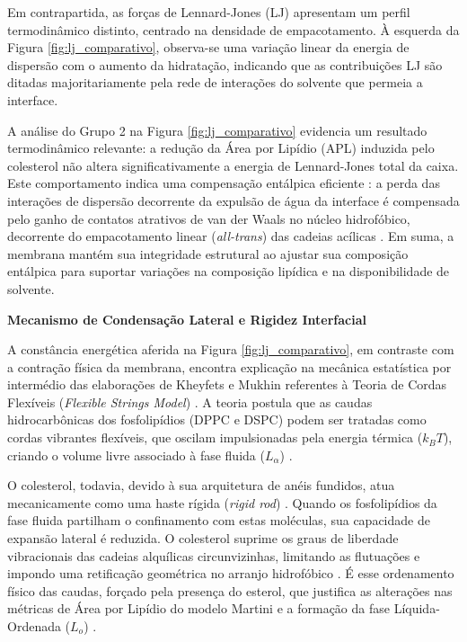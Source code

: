 Em contrapartida, as forças de Lennard-Jones (LJ) apresentam um perfil termodinâmico distinto, centrado na densidade de empacotamento. À esquerda da Figura \ref{fig:lj_comparativo}, observa-se uma variação linear da energia de dispersão com o aumento da hidratação, indicando que as contribuições LJ são ditadas majoritariamente pela rede de interações do solvente que permeia a interface.

A análise do Grupo 2 na Figura \ref{fig:lj_comparativo} evidencia um resultado termodinâmico relevante: a redução da Área por Lipídio (APL) induzida pelo colesterol não altera significativamente a energia de Lennard-Jones total da caixa. Este comportamento indica uma compensação entálpica eficiente \cite{bennett2018}: a perda das interações de dispersão decorrente da expulsão de água da interface é compensada pelo ganho de contatos atrativos de van der Waals no núcleo hidrofóbico, decorrente do empacotamento linear (\textit{all-trans}) das cadeias acílicas \cite{kheyfets2015}. Em suma, a membrana mantém sua integridade estrutural ao ajustar sua composição entálpica para suportar variações na composição lipídica e na disponibilidade de solvente.


\vspace{1em}
\noindent\textbf{Mecanismo de Condensação Lateral e Rigidez Interfacial}

A constância energética aferida na Figura \ref{fig:lj_comparativo}, em contraste com a contração física da membrana, encontra explicação na mecânica estatística por intermédio das elaborações de Kheyfets e Mukhin referentes à Teoria de Cordas Flexíveis (\textit{Flexible Strings Model}) \cite{kheyfets2015}. A teoria postula que as caudas hidrocarbônicas dos fosfolipídios (DPPC e DSPC) podem ser tratadas como cordas vibrantes flexíveis, que oscilam impulsionadas pela energia térmica ($k_B T$), criando o volume livre associado à fase fluida ($L_\alpha$) \cite{kheyfets2015}.

O colesterol, todavia, devido à sua arquitetura de anéis fundidos, atua mecanicamente como uma haste rígida (\textit{rigid rod}) \cite{kheyfets2015}. Quando os fosfolipídios da fase fluida partilham o confinamento com estas moléculas, sua capacidade de expansão lateral é reduzida. O colesterol suprime os graus de liberdade vibracionais das cadeias alquílicas circunvizinhas, limitando as flutuações e impondo uma retificação geométrica no arranjo hidrofóbico \cite{bennett2018}. É esse ordenamento físico das caudas, forçado pela presença do esterol, que justifica as alterações nas métricas de Área por Lipídio do modelo Martini e a formação da fase Líquida-Ordenada ($L_o$) \cite{bennett2018}.

